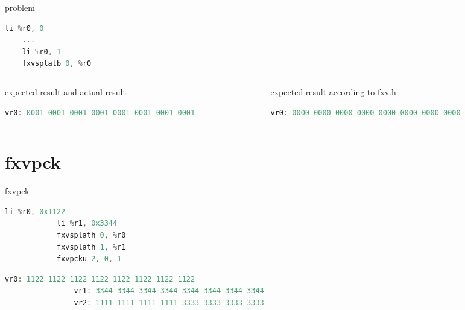 \documentclass[10pt]{beamer}
\begin{document}
\begin{frame}[fragile]{problem}{}
    \begin{lstlisting}[language=C++,basicstyle=\ttfamily\scriptsize,keywordstyle=\color{red}]
	li %r0, 0
	...
	li %r0, 1
	fxvsplatb 0, %r0
	\end{lstlisting}
	\begin{columns}[t]
		\begin{column}{0.4\textwidth}
			\begin{block}{expected result and actual result}
      			\begin{lstlisting}[language=C++,basicstyle=\fontsize{5}{7}\selectfont\ttfamily,keywordstyle=\color{red}]
				vr0: 0001 0001 0001 0001 0001 0001 0001 0001
				\end{lstlisting}
			\end{block}
    	\end{column}
    	\begin{column}{0.4\textwidth}
    		\begin{block}{expected result according to fxv.h}
      			\begin{lstlisting}[language=C++,basicstyle=\fontsize{5}{7}\selectfont\ttfamily,keywordstyle=\color{red}]
				vr0: 0000 0000 0000 0000 0000 0000 0000 0000
				\end{lstlisting}
			\end{block}
    	\end{column}
	\end{columns}
\end{frame}

\section{fxvpck}
\begin{frame}[fragile]{fxvpck}{}
		\begin{lstlisting}[language=C++,basicstyle=\ttfamily\scriptsize,keywordstyle=\color{red}]
			li %r0, 0x1122
			li %r1, 0x3344
			fxvsplath 0, %r0
			fxvsplath 1, %r1
			fxvpcku 2, 0, 1
		\end{lstlisting}
      		\begin{lstlisting}[language=C++,basicstyle=\fontsize{5}{7}\selectfont\ttfamily,keywordstyle=\color{red}]
				vr0: 1122 1122 1122 1122 1122 1122 1122 1122
				vr1: 3344 3344 3344 3344 3344 3344 3344 3344
				vr2: 1111 1111 1111 1111 3333 3333 3333 3333
			\end{lstlisting}
\end{frame}
\end{document}
